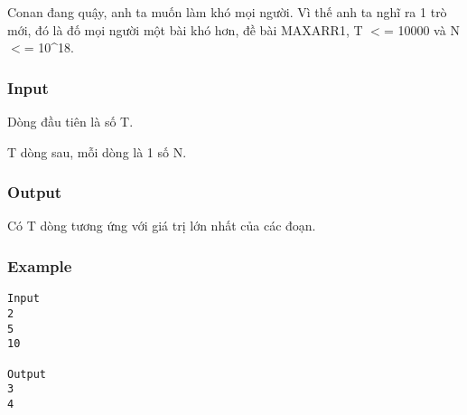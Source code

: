 



   Conan đang quậy, anh ta muốn làm khó mọi người. Vì thế anh ta nghĩ ra 1 trò mới, đó là đố mọi người một bài khó hơn, đề bài MAXARR1, T $<$= 10000 và N $<$= 10\textasciicircum18.  

\subsubsection{   Input  }

   Dòng đầu tiên là số T.  

   T dòng sau, mỗi dòng là 1 số N.  

\subsubsection{   Output  }

   Có T dòng tương ứng với giá trị lớn nhất của các đoạn.  

\subsubsection{   Example  }
\begin{verbatim}
Input
2
5
10

Output
3
4
\end{verbatim}